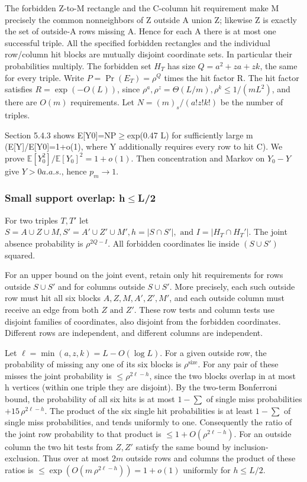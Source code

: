 \documentclass[11pt]{article}
\begin{document}
The forbidden Z-to-M rectangle and the C-column hit requirement make M precisely the common nonneighbors of Z outside A union Z; likewise Z is exactly the set of outside-A rows missing A. Hence for each A there is at most one successful triple. All the specified forbidden rectangles and the individual row/column hit blocks are mutually disjoint coordinate sets. In particular their probabilities multiply. The forbidden set $H_{T}$ has size $Q=a^2+za+zk$, the same for every triple. Write $P=\Pr(E_{T})=\rho ^{Q}$ times the hit factor R. The hit factor satisfies $R=\exp (-O(L))$, since $\rho ^{a},\rho ^{z}=\Theta (L/m), \rho ^{k}\leq 1/(m L^{2})$, and there are $O(m)$ requirements. Let $N=(m)_{s}/(a!z!k!)$ be the number of triples.

Section 5.4.3 shows E[Y0]=NP\ensuremath{\geq}exp(0.47 L) for sufficiently large m (E[Y]/E[Y0]=1+o(1), where Y additionally requires every row to hit C). We prove $\mathbb E[Y_{0}^{2}]/\mathbb E[Y_{0}]^{2}=1+o(1)$. Then concentration and Markov on $Y_{0}-Y$ give $Y>0 a.a.s.$, hence $p_{m}\to 1$.

\subsubsection{Small support overlap: h\ensuremath{\leq}L/2}

For two triples $T,T'$ let $S=A \cup  Z \cup  M, S'=A' \cup  Z' \cup  M', h=|S \cap  S'|, \text{ and } I=|H_{T} \cap  H_{T}'|$. The joint absence probability is $\rho ^{2Q-I}$. All forbidden coordinates lie inside $(S \cup  S')$ squared.

For an upper bound on the joint event, retain only hit requirements for rows outside $S \cup  S'$ and for columns outside $S \cup  S'$. More precisely, each such outside row must hit all six blocks $A,Z,M,A',Z',M'$, and each outside column must receive an edge from both $Z \text{ and } Z'$. These row tests and column tests use disjoint families of coordinates, also disjoint from the forbidden coordinates. Different rows are independent, and different columns are independent.

Let $\ell =\min (a,z,k)=L-O(\log  L)$. For a given outside row, the probability of missing any one of its six blocks is $\rho^{\text{size}}$. For any pair of these misses the joint probability is $\leq \rho ^{2\ell -h}$, since the two blocks overlap in at most h vertices (within one triple they are disjoint). By the two-term Bonferroni bound, the probability of all six hits is at most $1-\sum $ of single miss probabilities $+15\,\rho ^{2\ell -h}$. The product of the six single hit probabilities is at least $1-\sum $ of single miss probabilities, and tends uniformly to one. Consequently the ratio of the joint row probability to that product is $\leq 1+O(\rho ^{2\ell -h})$. For an outside column the two hit tests from $Z,Z'$ satisfy the same bound by inclusion-exclusion. Thus over at most $2m$ outside rows and columns the product of these ratios is $\leq \exp (O(m\,\rho ^{2\ell -h}))=1+o(1)$ uniformly for $h\leq L/2$.
\end{document}
